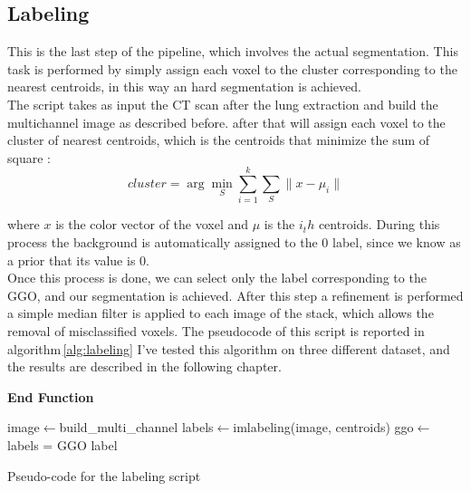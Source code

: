 
	
	\subsection{Labeling}
	
	This is the last step of the pipeline, which involves the actual segmentation. This task is performed by simply assign each voxel to the cluster corresponding to the nearest centroids, in this way an hard segmentation is achieved.\\
	
	The script takes as input the CT scan after the lung extraction and build the multichannel image as described before. after that will assign each voxel to the cluster of nearest centroids, which is the centroids that minimize the sum of square : 
	\begin{equation}
		cluster = \arg\min_{S}  \sum_{i=1}^k \sum_{S} \| x - \mu_i\|
	\end{equation}

	where $x$ is the color vector of the voxel and $\mu$ is the $i_th$ centroids. During this process the background is automatically assigned to the 0 label, since we know as a prior that its value is $0$.\\
	Once this process is done, we can select only the label corresponding to the GGO, and our segmentation is achieved. After this step a refinement is performed  a simple median filter is applied to each image of the stack, which allows the removal of misclassified voxels. 
	The pseudocode of this script is reported in algorithm\,\ref{alg:labeling}
	 I've tested this algorithm on three different dataset, and the results are described in the following chapter.
	 
	 	\begin{algorithm}
	 	\label{alg:labeling}
	 	\SetAlgoLined
	 	\DontPrintSemicolon
	 	
	 	
	 	\textbf{\textbf{End Function}}
 	
 		
 		image$\leftarrow$build\_multi\_channel\;
 		labels$\leftarrow$imlabeling(image, centroids)\;
 		ggo$\leftarrow$ labels = GGO label\;
	 
	 	\caption{Pseudo-code for the labeling script}
	 
	 \end{algorithm}
	 
	
	
